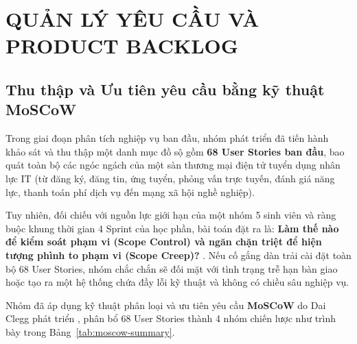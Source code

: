 \chapter{QUẢN LÝ YÊU CẦU VÀ PRODUCT BACKLOG}
\label{chap:quan-ly-yeu-cau}

\section{Thu thập và Ưu tiên yêu cầu bằng kỹ thuật MoSCoW}
\label{sec:moscow}

Trong giai đoạn phân tích nghiệp vụ ban đầu, nhóm phát triển đã tiến hành khảo sát và thu thập một danh mục đồ sộ gồm \textbf{68 User Stories ban đầu}, bao quát toàn bộ các ngóc ngách của một sàn thương mại điện tử tuyển dụng nhân lực IT (từ đăng ký, đăng tin, ứng tuyển, phỏng vấn trực tuyến, đánh giá năng lực, thanh toán phí dịch vụ đến mạng xã hội nghề nghiệp). 

Tuy nhiên, đối chiếu với nguồn lực giới hạn của một nhóm 5 sinh viên và ràng buộc khung thời gian 4 Sprint của học phần, bài toán đặt ra là: \textbf{Làm thế nào để kiểm soát phạm vi (Scope Control) và ngăn chặn triệt để hiện tượng phình to phạm vi (Scope Creep)?} \cite{pressman2020}. Nếu cố gắng dàn trải cài đặt toàn bộ 68 User Stories, nhóm chắc chắn sẽ đối mặt với tình trạng trễ hạn bàn giao hoặc tạo ra một hệ thống chứa đầy lỗi kỹ thuật và không có chiều sâu nghiệp vụ.

Nhóm đã áp dụng kỹ thuật phân loại và ưu tiên yêu cầu \textbf{MoSCoW} do Dai Clegg phát triển \cite{clegg1994}, phân bổ 68 User Stories thành 4 nhóm chiến lược như trình bày trong Bảng~\ref{tab:moscow-summary}.


